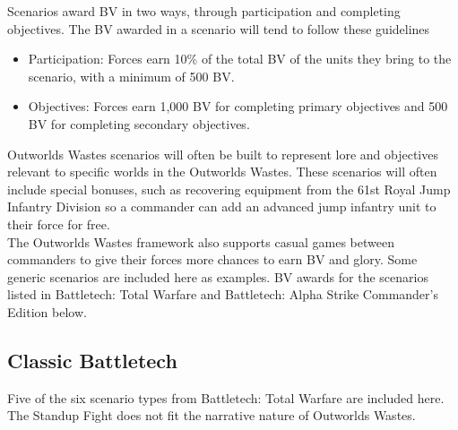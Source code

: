 \documentclass[UTF8]{article}
\begin{document}
Scenarios award BV in two ways, through participation and completing objectives.
The BV awarded in a scenario will tend to follow these guidelines

\begin{itemize}

\item Participation: Forces earn 10\% of the total BV of the units they bring to the scenario, with a minimum of 500 BV.

\item Objectives: Forces earn 1,000 BV for completing primary objectives and 500 BV for completing secondary objectives.

\end{itemize}

Outworlds Wastes scenarios will often be built to represent lore and objectives relevant to specific worlds in the Outworlds Wastes.
These scenarios will often include special bonuses, such as recovering equipment from the 61st Royal Jump Infantry Division so a commander can add an advanced jump infantry unit to their force for free.\\

The Outworlds Wastes framework also supports casual games between commanders to give their forces more chances to earn BV and glory.
Some generic scenarios are included here as examples.
BV awards for the scenarios listed in Battletech: Total Warfare and Battletech: Alpha Strike Commander's Edition below.

\subsection{Classic Battletech}

Five of the six scenario types from Battletech: Total Warfare are included here.
The Standup Fight does not fit the narrative nature of Outworlds Wastes.
\end{document}
